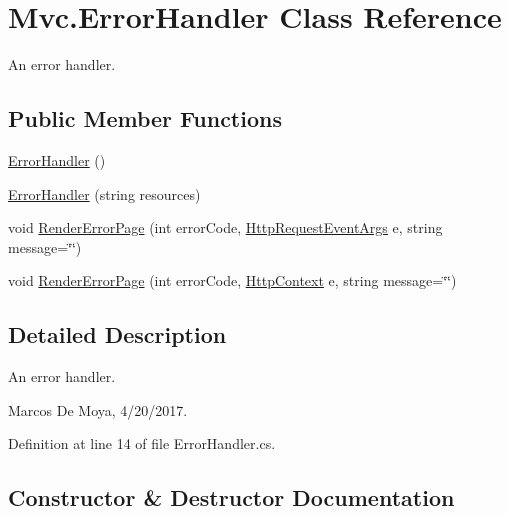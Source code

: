 \hypertarget{class_mvc_1_1_error_handler}{}\section{Mvc.\+Error\+Handler Class Reference}
\label{class_mvc_1_1_error_handler}


An error handler.  


\subsection*{Public Member Functions}
\begin{DoxyCompactItemize}
\item 
\hyperlink{class_mvc_1_1_error_handler_aa9bdf34d4d38732242caf76e97e17abb}{Error\+Handler} ()
\item 
\hyperlink{class_mvc_1_1_error_handler_a974f3fdae71752f2b98da9b03997aae5}{Error\+Handler} (string resources)
\item 
void \hyperlink{class_mvc_1_1_error_handler_aa320769f4764a66166616eb4ad26950a}{Render\+Error\+Page} (int error\+Code, \hyperlink{class_p_http_1_1_http_request_event_args}{Http\+Request\+Event\+Args} e, string message=\char`\"{}\char`\"{})
\item 
void \hyperlink{class_mvc_1_1_error_handler_aa560b2667b0451abc9efcedb43691312}{Render\+Error\+Page} (int error\+Code, \hyperlink{class_p_http_1_1_http_context}{Http\+Context} e, string message=\char`\"{}\char`\"{})
\end{DoxyCompactItemize}


\subsection{Detailed Description}
An error handler. 

Marcos De Moya, 4/20/2017. 

Definition at line 14 of file Error\+Handler.\+cs.



\subsection{Constructor \& Destructor Documentation}
\mbox{\label{class_mvc_1_1_error_handler_aa9bdf34d4d38732242caf76e97e17abb}} 
